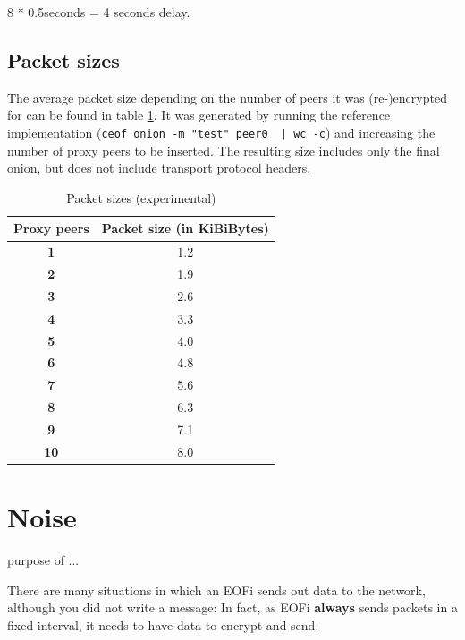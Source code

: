 8 * 0.5seconds = 4 seconds delay.


\subsection{Packet sizes}
The average packet size depending on the number of peers it was
(re-)encrypted for can be found in table \ref{pkgsizes}.
It was generated by running the reference implementation
(\verb=ceof onion -m "test" peer0  | wc -c=)
and increasing the number of proxy peers to be inserted.
The resulting size includes only the final onion,
but does not include transport protocol headers.
\begin{longtable}{|c|c|}
\caption{Packet sizes (experimental)}
\label{pkgsizes}\\
\hline
\textbf{Proxy peers} & \textbf{Packet size (in KiBiBytes)}\\
\hline
\textbf{1} & 1.2\\
\hline
\textbf{2} & 1.9\\
\hline
\textbf{3} & 2.6\\
\hline
\textbf{4} & 3.3\\
\hline
\textbf{5} & 4.0\\
\hline
\textbf{6} & 4.8\\
\hline
\textbf{7} & 5.6\\
\hline
\textbf{8} & 6.3\\
\hline
\textbf{9} & 7.1\\
\hline
\textbf{10} & 8.0\\
\hline
\end{longtable}


\section{Noise}

purpose of ... 

There are many situations in which an EOFi sends out data to the network,
although you did not write a message: In fact, as EOFi \textbf{always}
sends packets in a fixed interval, it needs to have data to encrypt and send.

